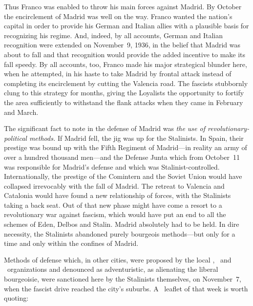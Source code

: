 \indexFFranco{}
Thus Franco was enabled to throw his main forces against Madrid. By October the encirclement of Madrid was well on the way. Franco wanted the nation’s capital in order to provide his German and Italian allies with a plausible basis for recognizing his regime. And, indeed, by all accounts, German and Italian recognition were extended on November~9, 1936, in the belief that Madrid was about to fall and that recognition would provide the added incentive to make its fall speedy. By all accounts, too, Franco made his major strategical blunder here, when he attempted, in his haste to take Madrid by frontal attack instead of completing its encirclement by cutting the Valencia road. The fascists stubbornly clung to this strategy for months, giving the Loyalists the opportunity to fortify the area sufficiently to withstand the flank attacks when they came in February and March.

The significant fact to note in the defense of Madrid was \emph{the use of revolutionary-political methods.} If Madrid fell, the jig was up for the Stalinists. In Spain, their prestige was bound up with the Fifth Regiment of Madrid---in reality an army of over a hundred thousand men---and the Defense Junta which from October~11 was responsible for Madrid’s defense and which was Stalinist-controlled. Internationally, the prestige of the Comintern and the Soviet Union would have collapsed irrevocably with the fall of Madrid. The retreat to Valencia and Catalonia would have found a new relationship of forces, with the Stalinists taking a back seat. Out of that new phase might have come a resort to a revolutionary war against fascism, which would have put an end to all the schemes of Eden, Delbos and Stalin. Madrid absolutely had to be held. In dire necessity, the Stalinists abandoned purely bourgeois methods---but only for a time and only within the confines of Madrid.

\indexCNT{}
Methods of defense which, in other cities, were proposed by the local \POUM, \FAI\ and \CNT\ organizations and denounced as adventuristic, as alienating the liberal bourgeoisie, were sanctioned here by the Stalinists themselves, on November~7, when the fascist drive reached the city’s suburbs. A \CNT\ leaflet of that week is worth quoting:

